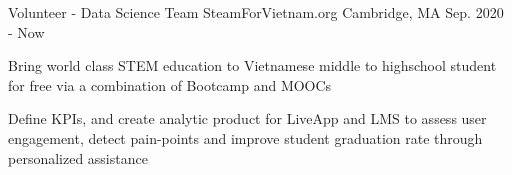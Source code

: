 

\begin{cventries}

  \cventry
    {Volunteer - Data Science Team} %
    {SteamForVietnam.org} %
    {Cambridge, MA} %
    {Sep. 2020 - Now} %
    {
      \begin{cvitems} %
        \item {Bring world class STEM education to Vietnamese middle to highschool student for free via a combination
        of Bootcamp and MOOCs}
        \item {Define KPIs, and create analytic product for LiveApp and LMS to assess user engagement, detect pain-points 
        and improve student graduation rate through personalized assistance}
      \end{cvitems}
    }

\end{cventries}
